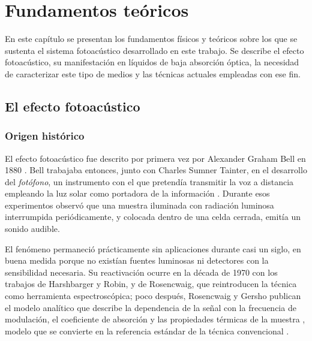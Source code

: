 \chapter{Fundamentos teóricos}
\label{cap:fundamentos}

En este capítulo se presentan los fundamentos físicos y teóricos
sobre los que se sustenta el sistema fotoacústico desarrollado
en este trabajo. Se describe el efecto fotoacústico, su manifestación
en líquidos de baja absorción óptica, la necesidad de caracterizar
este tipo de medios y las técnicas actuales empleadas con ese fin.

\section{El efecto fotoacústico}
\label{sec:efecto_fotoacustico}

\subsection*{Origen histórico}

El efecto fotoacústico fue descrito por primera vez por Alexander
Graham Bell en 1880 \cite{Bell1880}. Bell trabajaba entonces, junto
con Charles Sumner Tainter, en el desarrollo del \textit{fotófono},
un instrumento con el que pretendía transmitir la voz a distancia
empleando la luz solar como portadora de la información
\cite{Marin2008}. Durante esos experimentos observó que una muestra
iluminada con radiación luminosa interrumpida periódicamente, y
colocada dentro de una celda cerrada, emitía un sonido audible.

El fenómeno permaneció prácticamente sin aplicaciones durante casi
un siglo, en buena medida porque no existían fuentes luminosas ni
detectores con la sensibilidad necesaria. Su reactivación ocurre en
la década de 1970 con los trabajos de Harshbarger y Robin, y de
Rosencwaig, que reintroducen la técnica como herramienta
espectroscópica; poco después, Rosencwaig y Gersho publican el
modelo analítico que describe la dependencia de la señal con la
frecuencia de modulación, el coeficiente de absorción y las
propiedades térmicas de la muestra \cite{RosencwaigGersho1976},
modelo que se convierte en la referencia estándar de la técnica
convencional \cite{PatelTam1981}.

